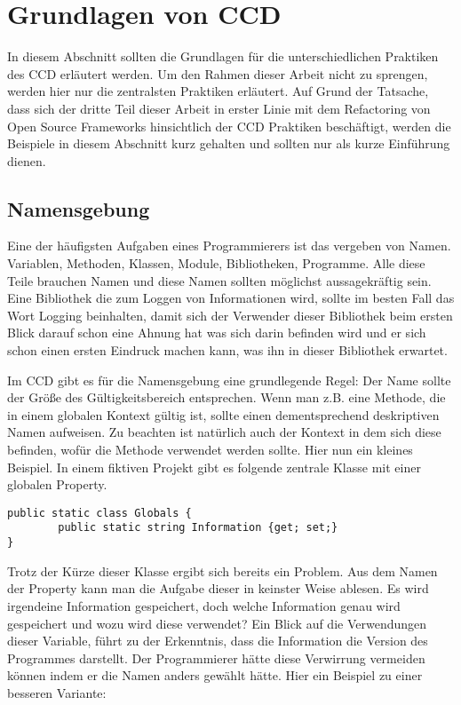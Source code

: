 \chapter{Grundlagen von CCD}
\label{cha:GrundlagenVonCCD}

\SuperPar In diesem Abschnitt sollten die Grundlagen für die unterschiedlichen Praktiken des CCD erläutert werden. Um den Rahmen dieser Arbeit nicht zu sprengen, werden hier nur die zentralsten Praktiken erläutert. Auf Grund der Tatsache, dass sich der dritte Teil dieser Arbeit in erster Linie mit dem Refactoring von Open Source Frameworks hinsichtlich der CCD Praktiken beschäftigt, werden die Beispiele in diesem Abschnitt kurz gehalten und sollten nur als kurze Einführung dienen.

\section{Namensgebung}

Eine der häufigsten Aufgaben eines Programmierers ist das vergeben von Namen. Variablen, Methoden, Klassen, Module, Bibliotheken, Programme. Alle diese Teile brauchen Namen und diese Namen sollten möglichst aussagekräftig sein. Eine Bibliothek die zum Loggen von Informationen wird, sollte im besten Fall das Wort Logging beinhalten, damit sich der Verwender dieser Bibliothek beim ersten Blick darauf schon eine Ahnung hat was sich darin befinden wird und er sich schon einen ersten Eindruck machen kann, was ihn in dieser Bibliothek erwartet.

\SuperPar Im CCD gibt es für die Namensgebung eine grundlegende Regel: Der Name sollte der Größe des Gültigkeitsbereich entsprechen. Wenn man z.B. eine Methode, die in einem globalen Kontext gültig ist, sollte einen dementsprechend deskriptiven Namen aufweisen. Zu beachten ist natürlich auch der Kontext in dem sich diese  befinden, wofür die Methode verwendet werden sollte. Hier nun ein kleines Beispiel. In einem fiktiven Projekt gibt es folgende zentrale Klasse mit einer globalen Property.

\begin{lstlisting}[caption=Beispiele für die Verwendung von \textit{GetByPredicate}, label=lst:GetByPredicate]
public static class Globals {
		public static string Information {get; set;}
}
\end{lstlisting}

Trotz der Kürze dieser Klasse ergibt sich bereits ein Problem. Aus dem Namen der Property kann man die Aufgabe dieser in keinster Weise ablesen. Es wird irgendeine Information gespeichert, doch welche Information genau wird gespeichert und wozu wird diese verwendet? Ein Blick auf die Verwendungen dieser Variable, führt zu der Erkenntnis, dass die Information die Version des Programmes darstellt. Der Programmierer hätte diese Verwirrung vermeiden können indem er die Namen anders gewählt hätte. Hier ein Beispiel zu einer besseren Variante:


